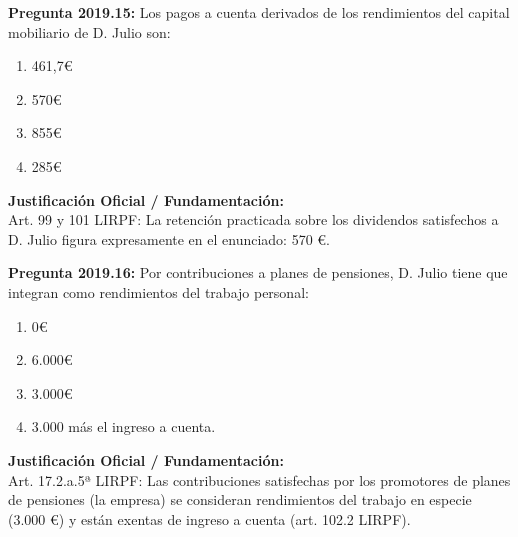 \documentclass[11pt,a4paper,openany]{article}
\begin{document}
\noindent\textbf{\sffamily Pregunta 2019.15:} Los pagos a cuenta derivados de los rendimientos del capital mobiliario de D. Julio son:\\[0.15cm]
\begin{enumerate}[label=\textbf{\alph*)},leftmargin=1.8em,itemsep=1.5pt,topsep=2pt,partopsep=0pt,parsep=0pt]
    \item 461,7\euro{}
    \item 570\euro{}
    \item 855\euro{}
    \item 285\euro{}
\end{enumerate}
\begin{solucionBox}
\textbf{Justificación Oficial / Fundamentación:}\\[0.1cm]
Art. 99 y 101 LIRPF: La retención practicada sobre los dividendos satisfechos a D. Julio figura expresamente en el enunciado: 570 \euro{}.
\end{solucionBox}
\vspace{0.35cm}

\noindent\textbf{\sffamily Pregunta 2019.16:} Por contribuciones a planes de pensiones, D. Julio tiene que integran como rendimientos del trabajo personal:\\[0.15cm]
\begin{enumerate}[label=\textbf{\alph*)},leftmargin=1.8em,itemsep=1.5pt,topsep=2pt,partopsep=0pt,parsep=0pt]
    \item 0\euro{}
    \item 6.000\euro{}
    \item 3.000\euro{}
    \item 3.000 más el ingreso a cuenta.
\end{enumerate}
\begin{solucionBox}
\textbf{Justificación Oficial / Fundamentación:}\\[0.1cm]
Art. 17.2.a.5ª LIRPF: Las contribuciones satisfechas por los promotores de planes de pensiones (la empresa) se consideran rendimientos del trabajo en especie (3.000 \euro{}) y están exentas de ingreso a cuenta (art. 102.2 LIRPF).
\end{solucionBox}
\vspace{0.35cm}
\end{document}
